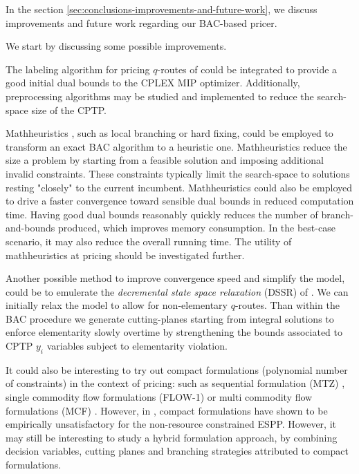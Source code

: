 In the section \cref{sec:conclusions-improvements-and-future-work},
we discuss improvements and future work regarding our BAC-based pricer.

We start by discussing some possible improvements.

The labeling algorithm for pricing $q$-routes of \textcite{desrochers1992} could be integrated
to provide a good initial dual bounds to the CPLEX MIP optimizer.
Additionally, preprocessing algorithms may be studied and implemented to reduce
the search-space size of the CPTP.

Mathheuristics \parencite{fischetti2018},
such as local branching \parencite{fischetti2003} or hard fixing,
could be employed to transform an exact BAC algorithm to a heuristic one.
Mathheuristics reduce the size a problem
by starting from a feasible solution and imposing additional invalid constraints.
These constraints typically limit the search-space to
solutions resting "closely" to the current incumbent.
Mathheuristics could also be employed to drive a faster convergence
toward sensible dual bounds in reduced computation time.
Having good dual bounds reasonably quickly reduces the number of branch-and-bounds produced,
which improves memory consumption.
In the best-case scenario, it may also reduce the overall running time.
The utility of mathheuristics at pricing should be investigated further.

Another possible method to improve convergence speed and simplify
the model, could be to emulerate the \textit{decremental state space relaxation} (DSSR)
of \textcite{boland2006, righini2008, martinelli2014}.
We can initially relax the model to allow for non-elementary $q$-routes.
Than within the BAC procedure we generate cutting-planes starting from integral solutions
to enforce elementarity slowly overtime by strengthening the bounds associated
to CPTP $y_i$ variables subject to elementarity violation.

It could also be interesting to try out
compact formulations (polynomial number of constraints) in the context of pricing:
such as sequential formulation (MTZ) \parencite{miller1960},
single commodity flow formulations (FLOW-1) \parencite{gavish1978travelling}
or multi commodity flow formulations (MCF) \parencite{wong1980integer,claus1984new}.
However, in \textcite{taccari2016}, compact formulations have shown
to be empirically unsatisfactory for the non-resource constrained ESPP.
However, it may still be interesting to study a hybrid formulation approach,
by combining decision variables, cutting planes and branching strategies
attributed to compact formulations.

